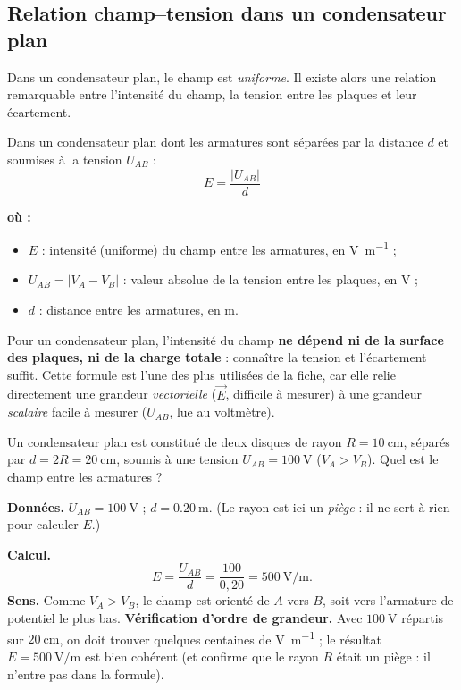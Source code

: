\documentclass[11pt,a4paper]{article}
\newenvironment{ou}{%
  \par\smallskip\noindent\textbf{où :}\nopagebreak
  \begin{itemize}[leftmargin=1.8em,topsep=2pt,itemsep=1.5pt,parsep=0pt]}%
  {\end{itemize}}
\newcommand{\vc}[1]{\vec{#1}}
\begin{document}
\subsection{Relation champ--tension dans un condensateur plan}

Dans un condensateur plan, le champ est \emph{uniforme}. Il existe alors une relation remarquable
entre l'intensité du champ, la tension entre les plaques et leur écartement.

\begin{formule}
Dans un condensateur plan dont les armatures sont séparées par la distance $d$ et soumises à la
tension $U_{AB}$ :
\[ \boxed{\,E = \dfrac{|U_{AB}|}{d}\,} \]
\begin{ou}
  \item $E$ : intensité (uniforme) du champ entre les armatures, en \si{\volt\per\metre} ;
  \item $U_{AB} = |V_A - V_B|$ : valeur absolue de la tension entre les plaques, en \si{\volt} ;
  \item $d$ : distance entre les armatures, en \si{\metre}.
\end{ou}
\end{formule}

\begin{remarque}
Pour un condensateur plan, l'intensité du champ \textbf{ne dépend ni de la surface des plaques, ni
de la charge totale} : connaître la tension et l'écartement suffit. Cette formule est l'une des
plus utilisées de la fiche, car elle relie directement une grandeur \emph{vectorielle} ($\vc{E}$,
difficile à mesurer) à une grandeur \emph{scalaire} facile à mesurer ($U_{AB}$, lue au voltmètre).
\end{remarque}

\begin{exemple}
Un condensateur plan est constitué de deux disques de rayon $R = \SI{10}{\centi\metre}$, séparés par
$d = 2R = \SI{20}{\centi\metre}$, soumis à une tension $U_{AB} = \SI{100}{\volt}$ ($V_A > V_B$).
Quel est le champ entre les armatures ?

\textbf{Données.} $U_{AB} = \SI{100}{\volt}$ ; $d = \SI{0.20}{\metre}$. (Le rayon est ici un
\emph{piège} : il ne sert à rien pour calculer $E$.)

\textbf{Calcul.}
\[ E = \frac{U_{AB}}{d} = \frac{100}{0{,}20} = \boxed{\SI{500}{\volt\per\metre}}. \]
\textbf{Sens.} Comme $V_A > V_B$, le champ est orienté de $A$ vers $B$, soit vers l'armature de
potentiel le plus bas.
\textbf{Vérification d'ordre de grandeur.} Avec $\SI{100}{\volt}$ répartis sur $\SI{20}{\centi\metre}$,
on doit trouver quelques centaines de \si{\volt\per\metre} ; le résultat $E = \SI{500}{\volt\per\metre}$
est bien cohérent (et confirme que le rayon $R$ était un piège : il n'entre pas dans la formule).
\end{exemple}
\end{document}
